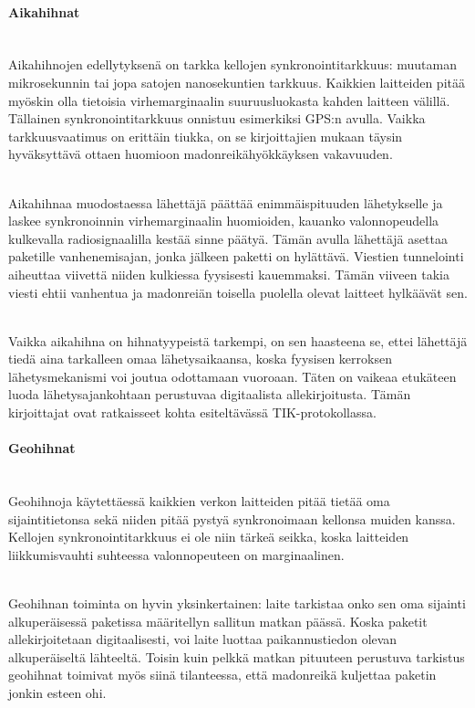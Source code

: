 \documentclass[finnish]{tktltiki2}
\theoremstyle{definition}
\theoremstyle{remark}
\begin{document}
\paragraph{Aikahihnat} 
\noindent \\
Aikahihnojen edellytyksenä on tarkka kellojen synkronointitarkkuus: muutaman mikrosekunnin tai jopa satojen nanosekuntien tarkkuus. Kaikkien laitteiden pitää myöskin olla tietoisia virhemarginaalin suuruusluokasta kahden laitteen välillä. Tällainen synkronointitarkkuus onnistuu esimerkiksi GPS:n avulla. Vaikka tarkkuusvaatimus on erittäin tiukka, on se kirjoittajien mukaan täysin hyväksyttävä ottaen huomioon madonreikähyökkäyksen vakavuuden.

\noindent \\
Aikahihnaa muodostaessa lähettäjä päättää enimmäispituuden lähetykselle ja laskee synkronoinnin virhemarginaalin huomioiden, kauanko valonnopeudella kulkevalla radiosignaalilla kestää sinne päätyä. Tämän avulla lähettäjä asettaa paketille vanhenemisajan, jonka jälkeen paketti on hylättävä. Viestien tunnelointi aiheuttaa viivettä niiden kulkiessa fyysisesti kauemmaksi. Tämän viiveen takia viesti ehtii vanhentua ja madonreiän toisella puolella olevat laitteet hylkäävät sen.

\noindent \\
Vaikka aikahihna on hihnatyypeistä tarkempi, on sen haasteena se, ettei lähettäjä tiedä aina tarkalleen omaa lähetysaikaansa, koska fyysisen kerroksen lähetysmekanismi voi joutua odottamaan vuoroaan. Täten on vaikeaa etukäteen luoda lähetysajankohtaan perustuvaa digitaalista allekirjoitusta. Tämän kirjoittajat ovat ratkaisseet kohta esiteltävässä TIK-protokollassa.

\paragraph{Geohihnat}
\noindent \\
Geohihnoja käytettäessä kaikkien verkon laitteiden pitää tietää oma sijaintitietonsa sekä niiden pitää pystyä synkronoimaan kellonsa muiden kanssa. Kellojen synkronointitarkkuus ei ole niin tärkeä seikka, koska laitteiden liikkumisvauhti suhteessa valonnopeuteen on marginaalinen.

\noindent \\
Geohihnan toiminta on hyvin yksinkertainen: laite tarkistaa onko sen oma sijainti alkuperäisessä paketissa määritellyn sallitun matkan päässä. Koska paketit allekirjoitetaan digitaalisesti, voi laite luottaa paikannustiedon olevan alkuperäiseltä lähteeltä. Toisin kuin pelkkä matkan pituuteen perustuva tarkistus geohihnat toimivat myös siinä tilanteessa, että madonreikä kuljettaa paketin jonkin esteen ohi.
\end{document}
